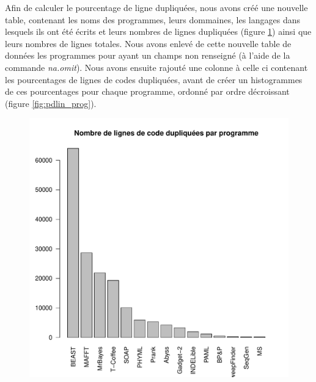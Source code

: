 Afin de calculer le pourcentage de ligne dupliquées, nous avons créé
une nouvelle table, contenant les noms des programmes, leurs
dommaines, les langages dans lesquels ils ont été écrits et leurs
nombres de lignes dupliquées (figure \ref{fig:dlin_prog}) ainsi que
leurs nombres de lignes totales. Nous avons enlevé de cette nouvelle
table de données les programmes pour ayant un champs non renseigné (à
l'aide de la commande \emph{na.omit}). Nous avons ensuite rajouté une
colonne à celle ci contenant les pourcentages de lignes de codes
dupliquées, avant de créer un histogrammes de ces pourcentages pour
chaque programme, ordonné par ordre décroissant (figure
\ref{fig:pdlin_prog}).

\begin{figure}[!h]
  \includegraphics[width=\linewidth]{figures/dlin_prog.pdf}
  \caption{}\label{fig:dlin_prog}
  \endminipage\hfill

\end{figure}
